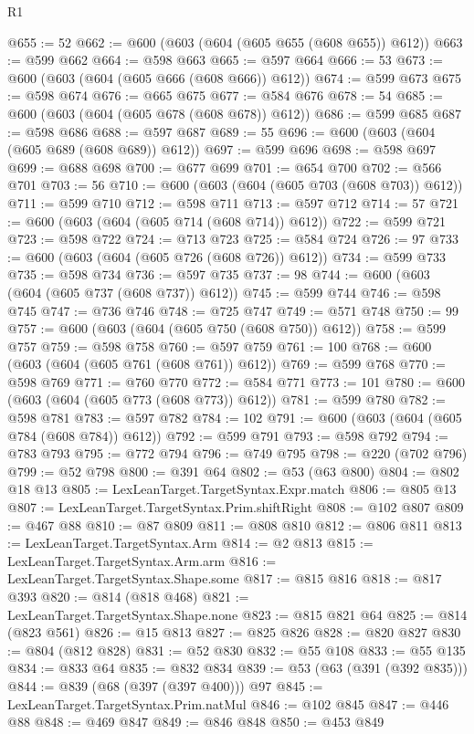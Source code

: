 \begin{lexlean}{R1}
\begin{coremodule}
@655 := 52
@662 := @600 (@603 (@604 (@605 @655 (@608 @655)) @612))
@663 := @599 @662
@664 := @598 @663
@665 := @597 @664
@666 := 53
@673 := @600 (@603 (@604 (@605 @666 (@608 @666)) @612))
@674 := @599 @673
@675 := @598 @674
@676 := @665 @675
@677 := @584 @676
@678 := 54
@685 := @600 (@603 (@604 (@605 @678 (@608 @678)) @612))
@686 := @599 @685
@687 := @598 @686
@688 := @597 @687
@689 := 55
@696 := @600 (@603 (@604 (@605 @689 (@608 @689)) @612))
@697 := @599 @696
@698 := @598 @697
@699 := @688 @698
@700 := @677 @699
@701 := @654 @700
@702 := @566 @701
@703 := 56
@710 := @600 (@603 (@604 (@605 @703 (@608 @703)) @612))
@711 := @599 @710
@712 := @598 @711
@713 := @597 @712
@714 := 57
@721 := @600 (@603 (@604 (@605 @714 (@608 @714)) @612))
@722 := @599 @721
@723 := @598 @722
@724 := @713 @723
@725 := @584 @724
@726 := 97
@733 := @600 (@603 (@604 (@605 @726 (@608 @726)) @612))
@734 := @599 @733
@735 := @598 @734
@736 := @597 @735
@737 := 98
@744 := @600 (@603 (@604 (@605 @737 (@608 @737)) @612))
@745 := @599 @744
@746 := @598 @745
@747 := @736 @746
@748 := @725 @747
@749 := @571 @748
@750 := 99
@757 := @600 (@603 (@604 (@605 @750 (@608 @750)) @612))
@758 := @599 @757
@759 := @598 @758
@760 := @597 @759
@761 := 100
@768 := @600 (@603 (@604 (@605 @761 (@608 @761)) @612))
@769 := @599 @768
@770 := @598 @769
@771 := @760 @770
@772 := @584 @771
@773 := 101
@780 := @600 (@603 (@604 (@605 @773 (@608 @773)) @612))
@781 := @599 @780
@782 := @598 @781
@783 := @597 @782
@784 := 102
@791 := @600 (@603 (@604 (@605 @784 (@608 @784)) @612))
@792 := @599 @791
@793 := @598 @792
@794 := @783 @793
@795 := @772 @794
@796 := @749 @795
@798 := @220 (@702 @796)
@799 := @52 @798
@800 := @391 @64
@802 := @53 (@63 @800)
@804 := @802 @18 @13
@805 := LexLeanTarget.TargetSyntax.Expr.match
@806 := @805 @13
@807 := LexLeanTarget.TargetSyntax.Prim.shiftRight
@808 := @102 @807
@809 := @467 @88
@810 := @87 @809
@811 := @808 @810
@812 := @806 @811
@813 := LexLeanTarget.TargetSyntax.Arm
@814 := @2 @813
@815 := LexLeanTarget.TargetSyntax.Arm.arm
@816 := LexLeanTarget.TargetSyntax.Shape.some
@817 := @815 @816
@818 := @817 @393
@820 := @814 (@818 @468)
@821 := LexLeanTarget.TargetSyntax.Shape.none
@823 := @815 @821 @64
@825 := @814 (@823 @561)
@826 := @15 @813
@827 := @825 @826
@828 := @820 @827
@830 := @804 (@812 @828)
@831 := @52 @830
@832 := @55 @108
@833 := @55 @135
@834 := @833 @64
@835 := @832 @834
@839 := @53 (@63 (@391 (@392 @835)))
@844 := @839 (@68 (@397 (@397 @400))) @97
@845 := LexLeanTarget.TargetSyntax.Prim.natMul
@846 := @102 @845
@847 := @446 @88
@848 := @469 @847
@849 := @846 @848
@850 := @453 @849

\end{coremodule}
\end{lexlean}
